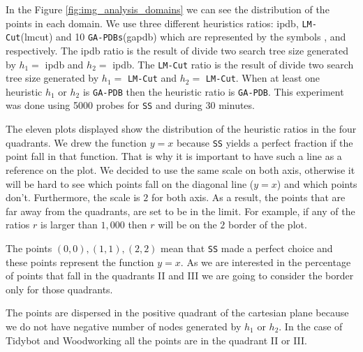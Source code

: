 In the Figure \ref{fig:img_analysis_domains} we can see the distribution of the points in each domain. We use three different heuristics ratios: ipdb, \texttt{LM-Cut}(lmcut) and 10 \texttt{GA-PDBs}(gapdb) which are represented by the symbols  ,  and  respectively. The ipdb ratio is the result of divide two search tree size generated by $h_{1} =$ ipdb and $h_{2} =$ ipdb. The \texttt{LM-Cut} ratio is the result of divide two search tree size generated by $h_{1} =$ \texttt{LM-Cut} and $h_{2} =$  \texttt{LM-Cut}. When at least one heuristic $h_{1}$ or $h_{2}$ is \texttt{GA-PDB} then the heuristic ratio is \texttt{GA-PDB}. This experiment was done using 5000 probes for \texttt{SS} and during 30 minutes.

The eleven plots displayed show the distribution of the heuristic ratios in the four quadrants. We drew the function $y = x$ because \texttt{SS} yields a perfect fraction if the point fall in that function. That is why it is important to have such a line as a reference on the plot. We decided to use the same scale on both axis, otherwise it will be hard to see which points fall on the diagonal line ($y = x$) and which points don't. Furthermore, the scale is $2$ for both axis. As a result, the points that are far away from the quadrants, are set to be in the limit. For example, if any of the ratios $r$ is larger than $1,000$ then $r$ will be on the $2$ border of the plot.

The points $(0,0), (1,1), (2,2)$ mean that \texttt{SS} made a perfect choice and these points represent the function $y = x$. As we are interested in the percentage of points that fall in the quadrants II and III we are going to consider the border only for those quadrants.

The points are dispersed in the positive quadrant of the cartesian plane because we do not have negative number of nodes generated by $h_{1}$ or $h_{2}$. In the case of Tidybot and Woodworking all the points are in the quadrant II or III.

